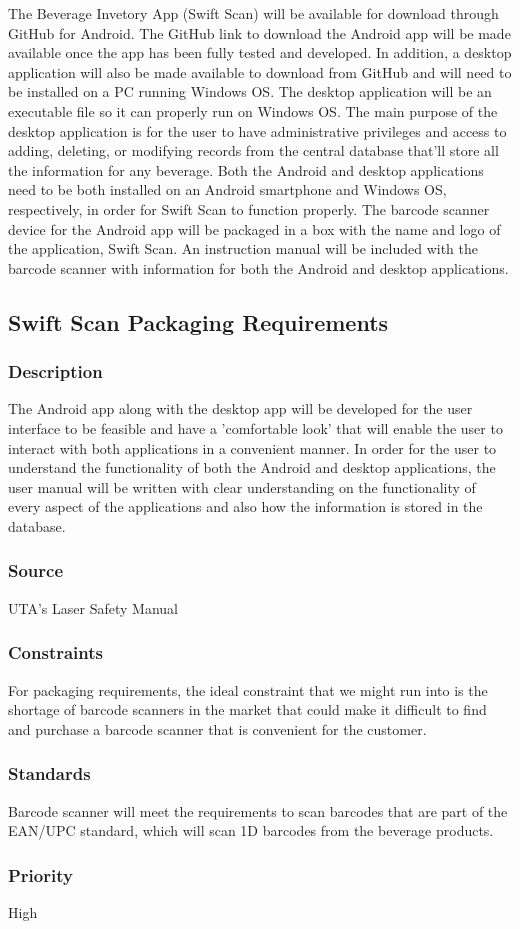 The Beverage Invetory App (Swift Scan) will be available for download through GitHub for Android.  The GitHub link to download the Android app will be made available once the app has been fully tested and developed.  In addition, a desktop application will also be made available to download from GitHub and will need to be installed on a PC running Windows OS.  The desktop application will be an executable file so it can properly run on Windows OS.  The main purpose of the desktop application is for the user to have administrative privileges and access to adding, deleting, or modifying records from the central database that'll store all the information for any beverage.  Both the Android and desktop applications need to be both installed on an Android smartphone and Windows OS, respectively, in order for Swift Scan to function properly.  The barcode scanner device for the Android app will be packaged in a box with the name and logo of the application, Swift Scan.  An instruction manual will be included with the barcode scanner with information for both the Android and desktop applications.

\subsection{Swift Scan Packaging Requirements}
\subsubsection{Description}
The Android app along with the desktop app will be developed for the user interface to be feasible and have a 'comfortable look' that will enable the user to interact with both applications in a convenient manner.  In order for the user to understand the functionality of both the Android and desktop applications, the user manual will be written with clear understanding on the functionality of every aspect of the applications and also how the information is stored in the database. 
\subsubsection{Source}
UTA's Laser Safety Manual
\subsubsection{Constraints}
For packaging requirements, the ideal constraint that we might run into is the shortage of barcode scanners in the market that could make it difficult to find and purchase a barcode scanner that is convenient for the customer.
\subsubsection{Standards}
Barcode scanner will meet the requirements to scan barcodes that are part of the EAN/UPC standard, which will scan 1D barcodes from the beverage products.
\subsubsection{Priority}
High
